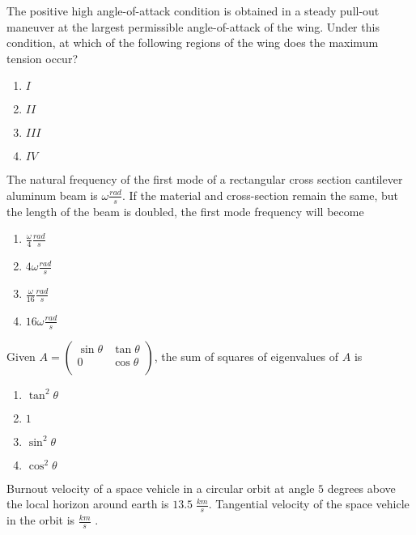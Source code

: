 \iffalse
\chapter{2020}
\section{ae}
\author{AI24BTECH11023 - Tarun Reddy Pakala}
\fi
\item The positive high angle-of-attack condition is obtained in a steady pull-out maneuver at the largest permissible angle-of-attack of the wing. Under this condition, at which of the following regions of the wing does the maximum tension occur?

\begin{enumerate}
    \item $I$
    \item $II$
    \item $III$
    \item $IV$
\end{enumerate}
\item The natural frequency of the first mode of a rectangular cross section cantilever aluminum beam is $\omega \frac{rad}{s}$. If the material and cross-section remain the same, but the length of the beam is doubled, the first mode frequency will become
\begin{enumerate}
    \item $\frac{\omega}{4}\frac{rad}{s}$
    \item $4\omega \frac{rad}{s}$
    \item $\frac{\omega}{16} \frac{rad}{s}$
    \item $16\omega \frac{rad}{s}$
\end{enumerate}
\item Given $A=\begin{pmatrix}
    \sin \theta & \tan \theta \\
    0 & \cos \theta \\
\end{pmatrix}$, the sum of squares of eigenvalues of $A$ is
\begin{enumerate}
    \item $\tan^2\theta$
    \item $1$
    \item $\sin^2\theta$
    \item $\cos^2\theta$
\end{enumerate}
\item Burnout velocity of a space vehicle in a circular orbit at angle $5$ degrees above the local horizon around earth is $13.5\;\frac{km}{s}$. Tangential velocity of the space vehicle in the orbit is \underline{\hspace{2cm}} $\frac{km}{s}$ .
